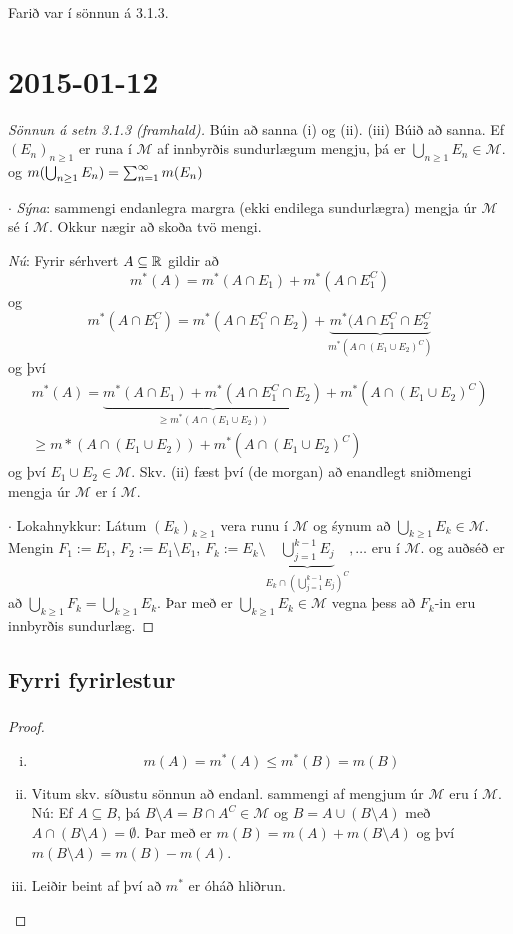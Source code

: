 \documentclass[12pt]{book}
\newcommand{\cM}{\mathcal{M}}
\begin{document}
Farið var í sönnun á 3.1.3.

\chapter{2015-01-12}

\begin{proof}[Sönnun á setn 3.1.3 (framhald)]
Búin að sanna (i) og (ii). (iii) Búið að sanna. Ef $(E_n)_{n \geq 1}$ er runa í $\cM$
af innbyrðis sundurlægum mengju, þá er $\bigcup_{n \geq 1} E_n \in \cM$.
og $m(\bigcup_{n \geq 1} E_n) = \sum_{n = 1}^{\infty} m (E_n)$

$\cdot$ \emph{Sýna}: sammengi endanlegra margra (ekki endilega sundurlægra) mengja úr $\cM$ sé í $\cM$.
Okkur nægir að skoða tvö mengi.

\emph{Nú}: Fyrir sérhvert $A \subseteq \mathbb{R}$
 gildir að \[m^*(A) = m^*(A \cap E_1) + m^*(A \cap E_1^C)\]
 og \[m^*(A \cap E_1^C)  = m^*(A \cap E_1^C \cap E_2) + \underbrace{m^*(A \cap E_1^C \cap E_2^C}_{m^*(A \cap (E_1 \cup E_2)^C)}\]
 og því
 \begin{gather*}
   m^*(A) = \underbrace{m^*(A \cap E_1) + m^*(A \cap E_1^C \cap
     E_2)}_{\geq m^*(A \cap (E_1 \cup E_2))} + m^*(A \cap (E_1 \cup E_2)^C)\\
    \geq m*(A \cap (E_1 \cup E_2)) + m^*(A \cap (E_1 \cup E_2)^C)
  \end{gather*}
  og því $E_1 \cup E_2 \in \cM$.
  Skv. (ii) fæst því (de morgan) að enandlegt sniðmengi mengja úr $\cM$ er í $\cM$.

  $\cdot$ Lokahnykkur: Látum $(E_k)_{k \geq 1}$ vera runu í $\cM$ og śynum að
  $\bigcup_{k \geq 1} E_k \in \cM$. Mengin $F_1 := E_1$, $F_2 := E_1 \setminus E_1$,
  $F_k := E_k \setminus \underbrace{\bigcup_{j=1}^{k-1} E_j}_{E_k \cap (\bigcup_{j=1}^{k-1} E_j)^C}, \dotsc$ eru í $\cM$.
  og auðséð er að $\bigcup_{k \geq 1} F_k = \bigcup_{k \geq 1} E_k$. Þar með
  er $\bigcup_{k \geq 1} E_k \in \cM$ vegna þess að $F_k$-in eru innbyrðis sundurlæg.
\end{proof}

\section{Fyrri fyrirlestur}
\subsection{}
\begin{proof}
  \begin{enumerate}[(i)]
  \item \[ m(A) = m^*(A) \leq m^*(B) = m(B) \]
  \item Vitum skv. síðustu sönnun að endanl. sammengi af mengjum úr $\cM$ eru
    í $\cM$.
    Nú: Ef $A \subseteq B$, þá $B \setminus A = B \cap A^C \in \cM$
    og $B = A \cup (B \setminus A)$ með $A \cap (B \setminus A) = \emptyset$.
    Þar með er $m(B) = m(A) + m(B \setminus A)$ og því
    $m(B \setminus A) = m(B) - m(A)$.

  \item Leiðir beint af því að $m^*$ er óháð hliðrun.
  \end{enumerate}
\end{proof}
\end{document}
